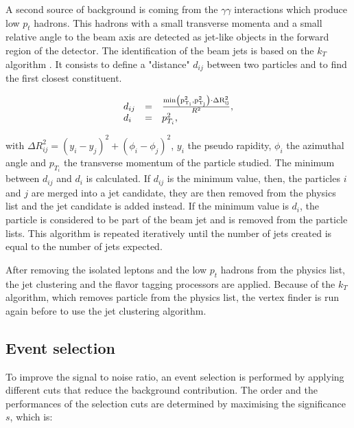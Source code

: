     A second source of background is coming from the $\gamma \gamma$ interactions which produce low $p_{t}$ hadrons.
    This hadrons with a small transverse momenta and a small relative angle to the beam axis are detected as jet-like objects in the forward region of the detector.
    The identification of the beam jets is based on the $k_{T}$ algorithm \cite{Cacciari2008}.
    It consists to define a "distance" $d_{ij}$ between two particles and to find the first closest constituent.
    
    \begin{equation}
      \begin{array}{lcl}
        d_{ij} & = & \frac{\rm{min}\left(p^2_{T_i}, p^2_{T_j}\right) \cdot \Delta R^2_{ij}}{R^2}, \\
        d_{i}  & = & p^2_{T_i},
      \end{array}
    \end{equation}

    with $\Delta R^2_{ij} = \left( y_{i} - y_{j}\right)^2 + \left( \phi_{i} - \phi_{j}\right)^2$, $y_{i}$ the pseudo rapidity, $\phi_{i}$ the azimuthal angle and $p_{T_i}$ the transverse momentum of the particle studied.
    The minimum between $d_{ij}$ and $d_{i}$ is calculated.
    If $d_{ij}$ is the minimum value, then, the particles $i$ and $j$ are merged into a jet candidate, they are then removed from the physics list and the jet candidate is added instead.
    If the minimum value is $d_{i}$, the particle is considered to be part of the beam jet and is removed from the particle lists.
    This algorithm is repeated iteratively until the number of jets created is equal to the number of jets expected.
   
    After removing the isolated leptons and the low $p_{t}$ hadrons from the physics list, the jet clustering and the flavor tagging processors are applied. 
    Because of the $k_{T}$ algorithm, which removes particle from the physics list, the vertex finder is run again before to use the jet clustering algorithm.

  \subsection{Event selection}

  To improve the signal to noise ratio, an event selection is performed by applying different cuts that reduce the background contribution.
  The order and the performances of the selection cuts are determined by maximising the significance $s$, which is:


